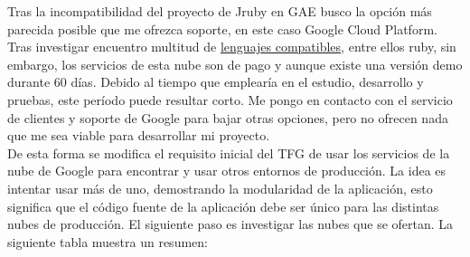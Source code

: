 Tras la incompatibilidad del proyecto de Jruby en GAE busco la opción más parecida posible que me ofrezca soporte, en este caso Google Cloud Platform. Tras investigar encuentro multitud de \href{https://cloud.google.com/launcher/explore}{lenguajes compatibles}, entre ellos ruby, sin embargo, los servicios de esta nube son de pago y aunque existe una versión demo durante 60 días. Debido al tiempo que emplearía en el estudio, desarrollo y pruebas, este período puede resultar corto. Me pongo en contacto con el servicio de clientes y soporte de Google para bajar otras opciones, pero no ofrecen nada que me sea viable para desarrollar mi proyecto.\\

De esta forma se modifica el requisito inicial del TFG de usar los servicios de la nube de Google para encontrar y usar otros entornos de producción. La idea es intentar usar más de uno, demostrando la modularidad de la aplicación, esto significa que el código fuente de la aplicación debe ser único para las distintas nubes de producción. El siguiente paso es investigar las nubes que se ofertan. La siguiente tabla muestra un resumen:

